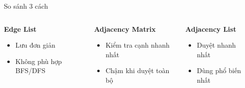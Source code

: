 \documentclass{beamer}
\begin{document}
\begin{frame}{So sánh 3 cách}

\begin{columns}

\begin{tcolorbox}
\textbf{\faBalanceScale Edge List}
\begin{itemize}
\item Lưu đơn giản
\item Không phù hợp BFS/DFS
\end{itemize}
\end{tcolorbox}

\vspace{0.2cm}

\begin{tcolorbox}
\textbf{\faBalanceScale Adjacency Matrix}
\begin{itemize}
\item Kiểm tra cạnh nhanh nhất
\item Chậm khi duyệt toàn bộ
\end{itemize}
\end{tcolorbox}


\begin{tcolorbox}
\textbf{\faBalanceScale Adjacency List}
\begin{itemize}
\item Duyệt nhanh nhất
\item Dùng phổ biến nhất
\end{itemize}
\end{tcolorbox}

\end{columns}

\end{frame}
\end{document}
